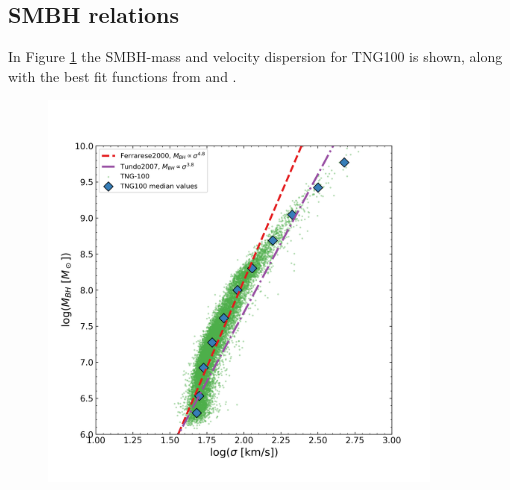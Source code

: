 \subsection{SMBH relations}
In Figure \ref{bh_res} the SMBH-mass and velocity dispersion for TNG100 is shown, along with the best fit functions from \cite{Ferrarese2000} and \cite{Tundo2007}.

\begin{figure}
    \centering
    \includegraphics[width=0.9\textwidth]{images/results_mass_BH_sigma.png}
    \caption{}
    \label{bh_res}
\end{figure}